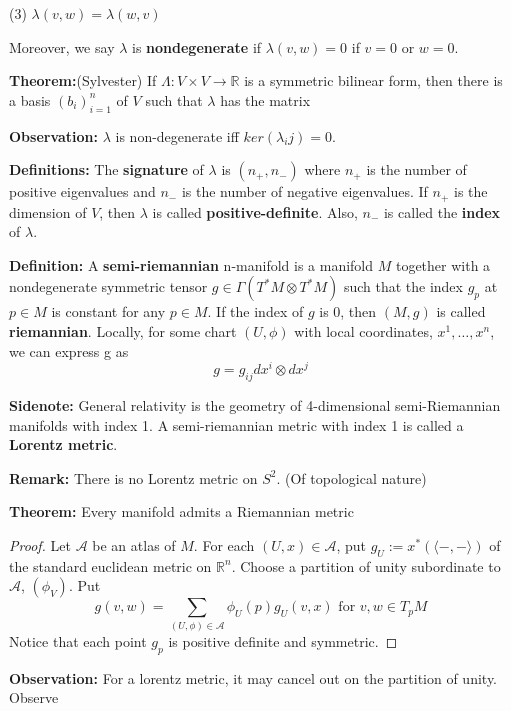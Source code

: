 \documentclass{article}
\begin{document}
(3) $\lambda(v,w) = \lambda(w,v)$

Moreover, we say $\lambda$ is \textbf{nondegenerate} if $\lambda(v,w) = 0$ if $v = 0$ or $w = 0$.

\textbf{Theorem:}(Sylvester) If $\Lambda: V\times V \to \mathbb{R}$ is a symmetric bilinear form, then there is a basis $(b_i)_{i=1}^n$ of $V$ such that $\lambda$ has the matrix

\textbf{Observation:} $\lambda$ is non-degenerate iff $ker(\lambda_ij) = 0$.

\textbf{Definitions:} The \textbf{signature} of $\lambda$ is $(n_+,n_-)$ where $n_+$ is the number of positive eigenvalues and $n_-$ is the number of negative eigenvalues. If $n_+$ is the dimension of $V$, then $\lambda$ is called \textbf{positive-definite}. Also, $n_-$ is called the \textbf{index} of $\lambda$.

\textbf{Definition:} A \textbf{semi-riemannian} n-manifold is a manifold $M$ together with a nondegenerate symmetric tensor $g \in \Gamma(T^*M \otimes T^*M)$ such that the index $g_p$ at $p \in M$ is constant for any $p \in M$. If the index of $g$ is 0, then $(M,g)$ is called \textbf{riemannian}. Locally, for some chart $(U,\phi)$ with local coordinates, $x^1, \ldots, x^n$, we can express g as
\[
g = g_{ij}dx^i\otimes dx^j
\]

\textbf{Sidenote:} General relativity is the geometry of 4-dimensional semi-Riemannian manifolds with index 1. A semi-riemannian metric with index 1 is called a \textbf{Lorentz metric}.

\textbf{Remark:} There is no Lorentz metric on $S^2$. (Of topological nature)

\textbf{Theorem:} Every manifold admits a Riemannian metric
\begin{proof}
Let $\mathscr{A}$ be an atlas of $M$. For each $(U,x) \in \mathscr{A}$, put $g_U:=x^*(\langle -,- \rangle)$ of the standard euclidean metric on $\mathbb{R}^n$. Choose a partition of unity subordinate to $\mathscr{A}$, $(\phi_V)$. Put
\[
g(v,w) = \sum_{(U,\phi)\in \mathscr{A}} \phi_U(p) g_U(v,x) \text{ for } v,w \in T_pM
\]
Notice that each point $g_p$ is positive definite and symmetric.
\end{proof}

\textbf{Observation:} For a lorentz metric, it may cancel out on the partition of unity. Observe
\end{document}
